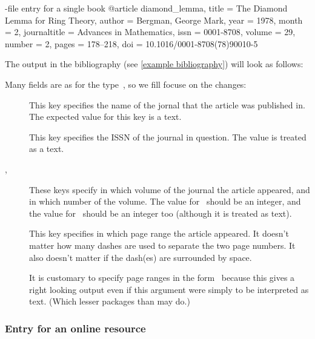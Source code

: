 \begin{refsection}
\begin{showcode}{-file entry for a single book}
@article {diamond_lemma,
  title         = {The Diamond Lemma for Ring Theory},
  author        = {Bergman, George Mark},
  year          = {1978},
  month         = {2},
  journaltitle  = {Advances in Mathematics},
  issn          = {0001-8708},
  volume        = {29},
  number        = {2},
  pages         = {178--218},
  doi           = {10.1016/0001-8708(78)90010-5}
}
\end{showcode}
The output in the bibliography (see \cref{example bibliography}) will look as follows:

Many fields are as for the type~, so we fill focuse on the changes:
\begin{description}
  \item[]
    This key specifies the name of the jornal that the article was published in.
    The expected value for this key is a text.
  \item[]
    This key specifies the ISSN of the journal in question.
    The value is treated as a text.
  \item[, ]
    These keys specify in which volume of the journal the article appeared, and in which number of the volume.
    The value for~ should be an integer, and the value for~ should be an integer too (although it is treated as text).
  \item[]
    This key specifies in which page range the article appeared.
    It doesn’t matter how many dashes are used to separate the two page numbers.
    It also doesn’t matter if the dash(es) are surrounded by space.
    
    It is customary to specify page ranges in the form~ because this gives a right looking output even if this argument were simply to be interpreted as text.
    (Which lesser packages than  may do.)
\end{description}

\subsubsection{Entry for an online resource}


\end{refsection}
